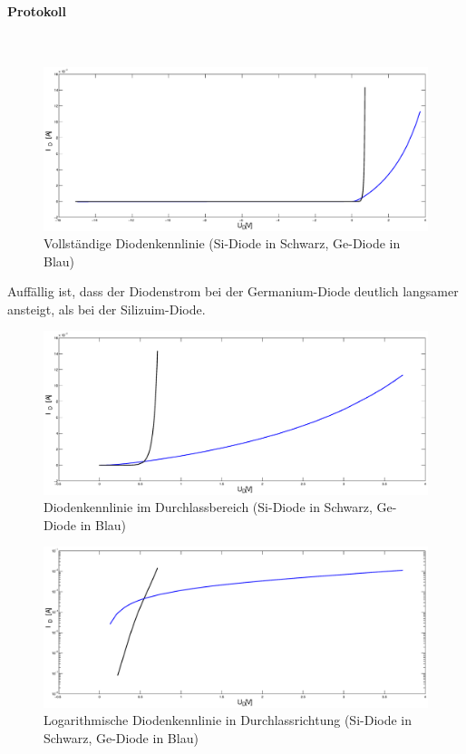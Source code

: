 \documentclass[10pt]{scrreprt}
\begin{document}
    \paragraph{Protokoll}
    $ $
    \begin{figure}[H]
        \includegraphics[width=\textwidth]{SVG/GeSiGes}
        \caption{Vollständige Diodenkennlinie (Si-Diode in Schwarz, Ge-Diode in Blau)}
    \end{figure}

    Auffällig ist, dass der Diodenstrom bei der Germanium-Diode deutlich langsamer
    ansteigt, als bei der Silizuim-Diode.

    \begin{figure}[H]
        \includegraphics[width=\textwidth]{SVG/GeSiDurch}
        \caption{Diodenkennlinie im Durchlassbereich (Si-Diode in Schwarz, Ge-Diode in Blau)}
    \end{figure}
    \begin{figure}[H]
        \includegraphics[width=\textwidth]{SVG/GeSiDurchLog}
        \caption{Logarithmische Diodenkennlinie in Durchlassrichtung (Si-Diode in Schwarz, Ge-Diode in Blau)}
        \label{fig:logzeug}
    \end{figure}
\end{document}
